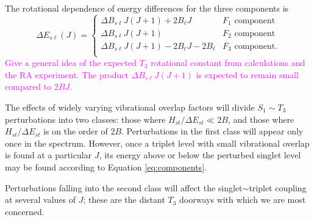 \documentclass[12pt,draft]{mitthesis}
\newcommand{\POINT}[1]{\textcolor{magenta}{#1}}
\begin{document}
The rotational dependence of energy differences for the three
components is
\begin{equation}
  \label{eq:components}
  \Delta E_{s\ell}(J) = 
  \begin{cases}
    \Delta B_{s\ell}J(J+1) + 2B_{\ell}J           
    & F_1 \text{ component}\\
    \Delta B_{s\ell}J(J+1)                      
    & F_2 \text{ component}\\
    \Delta B_{s\ell}J(J+1) - 2B_{\ell}J - 2B_{\ell} 
    & F_3 \text{ component}.\\
  \end{cases}
\end{equation}
\POINT{Give a general idea of the expected $T_3$ rotational constant
  from calculations and the RA experiment.  The product $\Delta
  B_{s\ell}J(J+1)$ is expected to remain small compared to $2BJ$.}

The effects of widely varying vibrational overlap factors will divide
$S_1 \sim T_3$ perturbations into two classes: those where
$H_{st}/\Delta E_{st} \ll 2B$, and those where $H_{st} / \Delta
E_{st}$ is on the order of $2B$.  Perturbations in the first class
will appear only once in the spectrum.  However, once a triplet level
with small vibrational overlap is found at a particular $J$, its
energy above or below the perturbed singlet level may be found
according to Equation \ref{eq:components}.

Perturbations falling into the second class will affect the
singlet$\sim$triplet coupling at several values of $J$; these are the
distant $T_3$ doorways with which we are most concerned.

\end{document}
